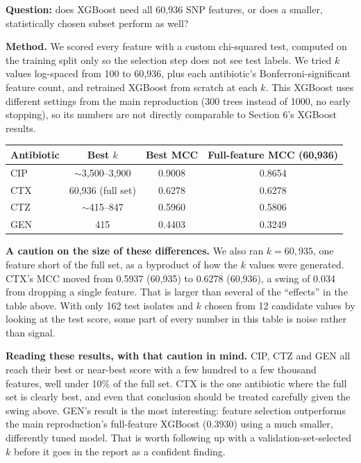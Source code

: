\documentclass[11pt]{article}
\begin{document}
\textbf{Question:} does XGBoost need all 60,936 SNP features, or does a smaller, statistically chosen subset perform as well?

\textbf{Method.} We scored every feature with a custom chi-squared test, computed on the training split only so the selection step does not see test labels. We tried $k$ values log-spaced from 100 to 60,936, plus each antibiotic's Bonferroni-significant feature count, and retrained XGBoost from scratch at each $k$. This XGBoost uses different settings from the main reproduction (300 trees instead of 1000, no early stopping), so its numbers are not directly comparable to Section 6's XGBoost results.

\begin{center}
\begin{tabular}{lccc}
\toprule
\textbf{Antibiotic} & \textbf{Best $k$} & \textbf{Best MCC} & \textbf{Full-feature MCC (60,936)} \\
\midrule
CIP & $\sim$3,500--3,900 & 0.9008 & 0.8654 \\
CTX & 60,936 (full set) & 0.6278 & 0.6278 \\
CTZ & $\sim$415--847 & 0.5960 & 0.5806 \\
GEN & 415 & 0.4403 & 0.3249 \\
\bottomrule
\end{tabular}
\end{center}

\textbf{A caution on the size of these differences.} We also ran $k = 60{,}935$, one feature short of the full set, as a byproduct of how the $k$ values were generated. CTX's MCC moved from 0.5937 (60,935) to 0.6278 (60,936), a swing of 0.034 from dropping a single feature. That is larger than several of the ``effects'' in the table above. With only 162 test isolates and $k$ chosen from 12 candidate values by looking at the test score, some part of every number in this table is noise rather than signal.

\textbf{Reading these results, with that caution in mind.} CIP, CTZ and GEN all reach their best or near-best score with a few hundred to a few thousand features, well under 10\% of the full set. CTX is the one antibiotic where the full set is clearly best, and even that conclusion should be treated carefully given the swing above. GEN's result is the most interesting: feature selection outperforms the main reproduction's full-feature XGBoost (0.3930) using a much smaller, differently tuned model. That is worth following up with a validation-set-selected $k$ before it goes in the report as a confident finding.
\end{document}
